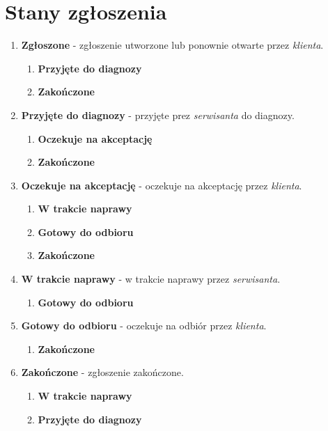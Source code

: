 \documentclass[11pt,a4paper]{article}
\begin{document}
\section{Stany zgłoszenia}
\begin{enumerate}
\item{\textbf{Zgłoszone} - zgłoszenie utworzone lub ponownie otwarte przez \textit{klienta}.}
\begin{enumerate}
\item{\textbf{Przyjęte do diagnozy}}
\item{\textbf{Zakończone}}
\end{enumerate}
\item{\textbf{Przyjęte do diagnozy} - przyjęte prez \textit{serwisanta} do diagnozy.}
\begin{enumerate}
\item{\textbf{Oczekuje na akceptację}}
\item{\textbf{Zakończone}}
\end{enumerate}
\item{\textbf{Oczekuje na akceptację} - oczekuje na akceptację przez \textit{klienta}.}
\begin{enumerate}
\item{\textbf{W trakcie naprawy}}
\item{\textbf{Gotowy do odbioru}}
\item{\textbf{Zakończone}}
\end{enumerate}
\item{\textbf{W trakcie naprawy} - w trakcie naprawy przez \textit{serwisanta}.}
\begin{enumerate}
\item{\textbf{Gotowy do odbioru}}
\end{enumerate}
\item{\textbf{Gotowy do odbioru} - oczekuje na odbiór przez \textit{klienta}.}
\begin{enumerate}
\item{\textbf{Zakończone}}
\end{enumerate}
\item{\textbf{Zakończone} - zgłoszenie zakończone.}
\begin{enumerate}
\item{\textbf{W trakcie naprawy}}
\item{\textbf{Przyjęte do diagnozy}}
\end{enumerate}
\end{enumerate}

\vfill
\end{document}
